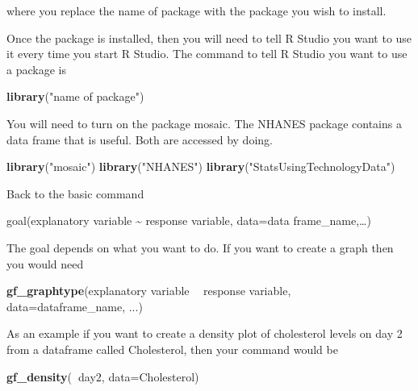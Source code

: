 \documentclass[
]{book}
\newenvironment{Shaded}{\begin{snugshade}}{\end{snugshade}}
\newcommand{\DataTypeTok}[1]{\textcolor[rgb]{0.13,0.29,0.53}{#1}}
\newcommand{\KeywordTok}[1]{\textcolor[rgb]{0.13,0.29,0.53}{\textbf{#1}}}
\newcommand{\NormalTok}[1]{#1}
\newcommand{\OperatorTok}[1]{\textcolor[rgb]{0.81,0.36,0.00}{\textbf{#1}}}
\newcommand{\StringTok}[1]{\textcolor[rgb]{0.31,0.60,0.02}{#1}}
\begin{document}
where you replace the name of package with the package you wish to install.

Once the package is installed, then you will need to tell R Studio you want to use it every time you start R Studio. The command to tell R Studio you want to use a package is

\begin{Shaded}
\begin{Highlighting}[]
\KeywordTok{library}\NormalTok{(}\StringTok{"name of package"}\NormalTok{)}
\end{Highlighting}
\end{Shaded}

You will need to turn on the package mosaic. The NHANES package contains a data frame that is useful. Both are accessed by doing.

\begin{Shaded}
\begin{Highlighting}[]
\KeywordTok{library}\NormalTok{(}\StringTok{"mosaic"}\NormalTok{)}
\KeywordTok{library}\NormalTok{(}\StringTok{"NHANES"}\NormalTok{)}
\KeywordTok{library}\NormalTok{(}\StringTok{"StatsUsingTechnologyData"}\NormalTok{)}
\end{Highlighting}
\end{Shaded}

Back to the basic command

goal(explanatory variable \textasciitilde{} response variable, data=data frame\_name,\ldots)

The goal depends on what you want to do. If you want to create a graph then you would need

\begin{Shaded}
\begin{Highlighting}[]
\KeywordTok{gf_graphtype}\NormalTok{(explanatory variable }\OperatorTok{~}\StringTok{ }\NormalTok{response variable, }\DataTypeTok{data=}\NormalTok{dataframe_name, ...)}
\end{Highlighting}
\end{Shaded}

As an example if you want to create a density plot of cholesterol levels on day 2 from a dataframe called Cholesterol, then your command would be

\begin{Shaded}
\begin{Highlighting}[]
\KeywordTok{gf_density}\NormalTok{(}\OperatorTok{~}\NormalTok{day2, }\DataTypeTok{data=}\NormalTok{Cholesterol)}
\end{Highlighting}
\end{Shaded}
\end{document}
